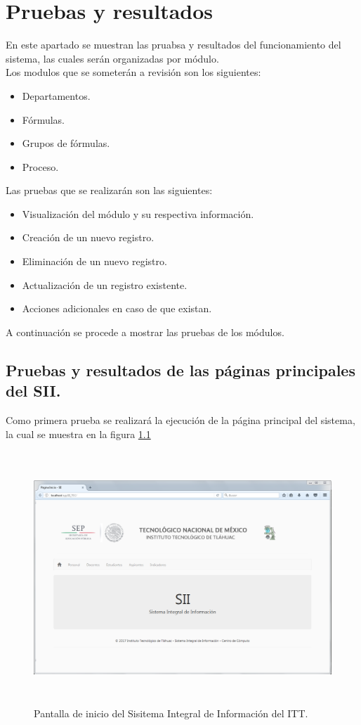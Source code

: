 \chapter{Pruebas y resultados}
	En este apartado se muestran las pruabsa y resultados del funcionamiento del sistema, las cuales ser\'an organizadas por m\'odulo.\\

	Los modulos que se someter\'an a revisi\'on son los siguientes:
	\begin{itemize}
		\item Departamentos.
		\item F\'ormulas.
		\item Grupos de f\'ormulas.
		\item Proceso.
	\end{itemize}

	Las pruebas que se realizar\'an son las siguientes:
	\begin{itemize}
		\item Visualizaci\'on del m\'odulo y su respectiva informaci\'on.
		\item Creaci\'on de un nuevo registro.
		\item Eliminaci\'on de un nuevo registro.
		\item Actualizaci\'on de un registro existente.
		\item Acciones adicionales en caso de que existan.
	\end{itemize}

	A continuaci\'on se procede a mostrar las pruebas de los m\'odulos. 

	\section{Pruebas y resultados de las p\'aginas principales del SII.}

		Como primera prueba se realizar\'a la ejecuci\'on de la p\'agina principal del sistema, la cual se muestra en la figura \ref{fig_principal}

		\begin{figure}[H]
	        \centering
	        \includegraphics[width=16cm, height=9.5cm]{figuras/principal}
	        \caption{Pantalla de inicio del Sisitema Integral de Informaci\'on del ITT.}
	        \label{fig_principal}
	    \end{figure}

